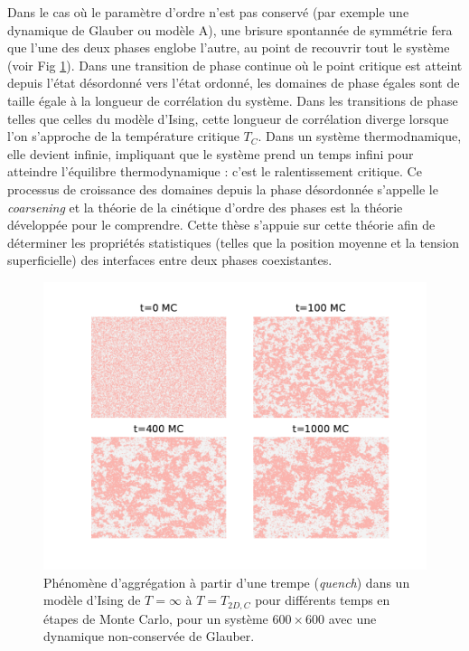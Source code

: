 Dans le cas où le paramètre d'ordre n'est pas conservé (par exemple une dynamique de Glauber ou modèle A), une brisure spontannée de symmétrie fera que l'une des deux phases englobe l'autre, au point de recouvrir tout le système (voir Fig \ref{clusterization}). Dans une transition de phase continue où le point critique est atteint depuis l'état désordonné vers l'état ordonné, les domaines de phase égales sont de taille égale à la longueur de corrélation du système. Dans les transitions de phase telles que celles du modèle d'Ising, cette longueur de corrélation diverge lorsque l'on s'approche de la température critique $T_C$. Dans un système thermodnamique, elle devient infinie, impliquant que le système prend un temps infini pour atteindre l'équilibre thermodynamique : c'est le ralentissement critique. Ce processus de croissance des domaines depuis la phase désordonnée s'appelle le \textit{coarsening} et la théorie de la cinétique d'ordre des phases est la théorie développée pour le comprendre.
Cette thèse s'appuie sur cette théorie afin de déterminer les propriétés statistiques (telles que la position moyenne et la tension superficielle) des interfaces entre deux phases coexistantes.
\begin{figure}[t]
    \centering
    \includegraphics[width=0.9\linewidth]{intro/clusterization.pdf}
    \caption{Phénomène d'aggrégation à partir d'une trempe (\textit{quench}) dans un modèle d'Ising de $T=\infty$ à $T=T_{2D,C}$ \cite{onsager_crystal_1944} pour différents temps en étapes de Monte Carlo, pour un système $600 \times 600$ avec une dynamique non-conservée de Glauber.}
    \label{clusterization}
\end{figure}


